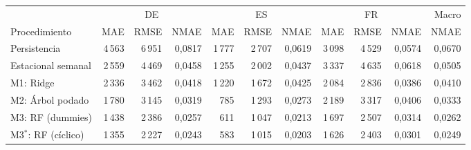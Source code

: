 \begin{tabular}{lrrrrrrrrrr}
\toprule
 & \multicolumn{3}{c}{DE} & \multicolumn{3}{c}{ES} & \multicolumn{3}{c}{FR} & Macro \\
\cmidrule(lr){2-4}\cmidrule(lr){5-7}\cmidrule(lr){8-10}
Procedimiento & MAE & RMSE & NMAE & MAE & RMSE & NMAE & MAE & RMSE & NMAE & NMAE \\
\midrule
Persistencia & 4\,563 & 6\,951 & 0{,}0817 & 1\,777 & 2\,707 & 0{,}0619 & 3\,098 & 4\,529 & 0{,}0574 & 0{,}0670 \\
\midrule
Estacional semanal & 2\,559 & 4\,469 & 0{,}0458 & 1\,255 & 2\,002 & 0{,}0437 & 3\,337 & 4\,635 & 0{,}0618 & 0{,}0505 \\
\midrule
M1: Ridge & 2\,336 & 3\,462 & 0{,}0418 & 1\,220 & 1\,672 & 0{,}0425 & 2\,084 & 2\,836 & 0{,}0386 & 0{,}0410 \\
\midrule
M2: Árbol podado & 1\,780 & 3\,145 & 0{,}0319 & 785 & 1\,293 & 0{,}0273 & 2\,189 & 3\,317 & 0{,}0406 & 0{,}0333 \\
\midrule
M3: RF (dummies) & 1\,438 & 2\,386 & 0{,}0257 & 611 & 1\,047 & 0{,}0213 & 1\,697 & 2\,507 & 0{,}0314 & 0{,}0262 \\
\midrule
M3$^\ast$: RF (cíclico) & 1\,355 & 2\,227 & 0{,}0243 & 583 & 1\,015 & 0{,}0203 & 1\,626 & 2\,403 & 0{,}0301 & 0{,}0249 \\
\bottomrule
\end{tabular}